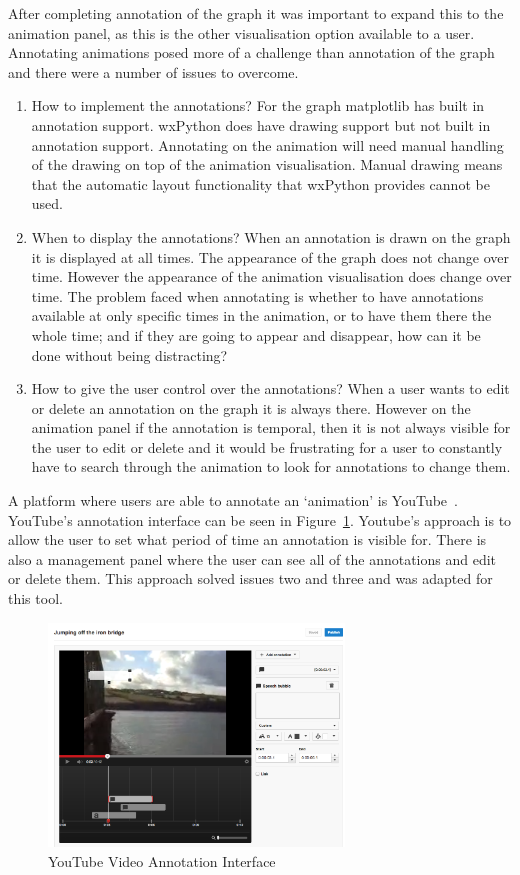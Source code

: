 After completing annotation of the graph it was important to expand this to the animation panel, as this is the other visualisation option available to a user.  Annotating animations posed more of a challenge than annotation of the graph and there were a number of issues to overcome.

\begin{enumerate}
\item How to implement the annotations?  For the graph matplotlib has built in annotation support.  wxPython does have drawing support but not built in annotation support.  Annotating on the animation will need manual handling of the drawing on top of the animation visualisation.  Manual drawing means that the automatic layout functionality that wxPython provides cannot be used.
\item When to display the annotations?  When an annotation is drawn on the graph it is displayed at all times.  The appearance of the graph does not change over time.  However the appearance of the animation visualisation does change over time.  The problem faced when annotating is whether to have annotations available at only specific times in the animation, or to have them there the whole time; and if they are going to appear and disappear, how can it be done without being distracting?
\item How to give the user control over the annotations? When a user wants to edit or delete an annotation on the graph it is always there.  However on the animation panel if the annotation is temporal, then it is not always visible for the user to edit or delete and it would be frustrating for a user to constantly have to search through the animation to look for annotations to change them.
\end{enumerate}

A platform where users are able to annotate an `animation' is YouTube~\cite{youtube}.  YouTube's annotation interface can be seen in Figure~\ref{fig:youtube}.  Youtube's approach is to allow the user to set what period of time an annotation is visible for.  There is also a management panel where the user can see all of the annotations and edit or delete them.  This approach solved issues two and three and was adapted for this tool.

\begin{figure}[h!]
    \centering
    \includegraphics[width=0.7\textwidth]{images/youtube.png}
    \caption{YouTube Video Annotation Interface}
    \label{fig:youtube}
\end{figure}

